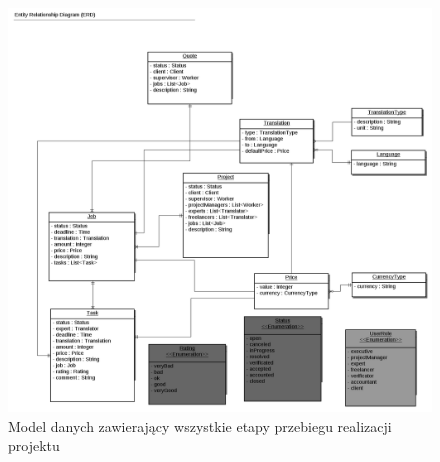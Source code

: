 \documentclass[licencjacka]{pracamgr}
\begin{document}
\begin{figure}[ht!]
\includegraphics[width=1.1\textwidth]{resources/data.png}
\caption{Model danych zawierający wszystkie etapy przebiegu realizacji projektu}
\end{figure}
\end{document}
